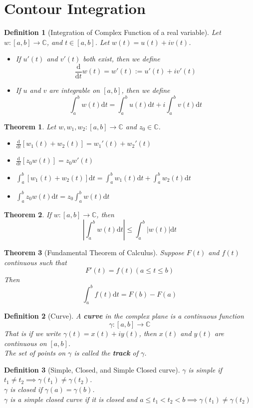 \documentclass[12pt]{article}
\newcommand{\diff}{\mathrm{d}}
\newtheorem{definition}{Definition}[section]
\newtheorem{theorem}{Theorem}[section]
\theoremstyle{definition}
\begin{document}
\section{Contour Integration}
\begin{definition}[Integration of Complex Function of a real variable]
\normalfont Let $w:[a,b]\to \mathbb{C}$, and $t\in[a,b]$. Let $w(t)=u(t)+iv(t)$.\\
\begin{itemize}
	\item If $u'(t)$ and $v'(t)$ both exist, then we define
	\[
\frac{\diff }{\diff t}w(t) = w'(t):=u'(t)+iv'(t)
	\]
	\item If $u$ and $v$ are integrable on $[a,b]$, then we define
	\[
\int_a^b w(t)\diff t = \int_a^b u(t)\diff t + i\int_a^b v(t)\diff t
	\]
\end{itemize}
\end{definition}
\begin{theorem}
\normalfont Let $w,w_1,w_2:[a,b]\to\mathbb{C}$ and $z_0\in \mathbb{C}$.
\begin{itemize}
	\item $\frac{\diff }{\diff t}[w_1(t) + w_2(t)]=w_1'(t)+w_2'(t)$
	\item $\frac{\diff }{\diff t}[z_0w(t)]=z_0w'(t)$
	\item $\int_a^b[w_1(t)+w_2(t)]\diff t = \int_a^b w_1(t)\diff t + \int_a^b w_2(t)\diff t$
	\item $\int_a^b z_0w(t)\diff t = z_0\int_a^b w(t)\diff t$
\end{itemize}
\end{theorem}
\begin{theorem}\normalfont If $w:[a,b]\to \mathbb{C}$, then
\[
\left|\int_a^b w(t)\diff t\right|\leq \int_a^b|w(t)|\diff t
\]
\end{theorem}
\begin{theorem}[Fundamental Theorem of Calculus]
\normalfont Suppose $F(t)$ and $f(t)$ continuous such that 
\[
F'(t)=f(t) (a\leq t \leq b)
\]
Then
\[
\int_a^b f(t)\diff t = F(b)- F(a)
\]
\end{theorem}
\begin{definition}[Curve]
\normalfont A \textbf{curve} in the complex plane is a continuous function
\[
\gamma:[a,b]\to\mathbb{C}
\]
That is if we write $\gamma(t)=x(t)+iy(t)$, then $x(t)$ and $y(t)$ are continuous on $[a,b]$.\\
The set of points on $\gamma$ is called the \textbf{track} of $\gamma$.
\end{definition}
\begin{definition}[Simple, Closed, and Simple Closed curve]
\normalfont $\gamma$ is simple if $t_1\neq t_2 \implies \gamma(t_1)\neq \gamma(t_2)$.\\
$\gamma$ is closed if $\gamma(a) = \gamma(b)$.\\
$\gamma$ is a simple closed curve if it is closed and $a\leq t_1 < t_2 < b \implies \gamma(t_1) \neq \gamma(t_2)$
\end{definition}
\end{document}

